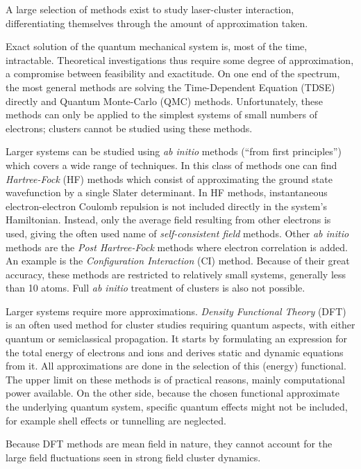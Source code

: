 A large selection of methods exist to study laser-cluster interaction,
differentiating themselves through the amount of approximation taken.

Exact solution of the quantum mechanical system is, most of the time,
intractable. Theoretical investigations thus require some degree of
approximation, a compromise between feasibility and exactitude. On one end of
the spectrum, the most general methods are solving the
Time-Dependent \schrodinger Equation (TDSE) directly and Quantum Monte-Carlo
(QMC) methods\cite{Nightingale1998}. Unfortunately, these methods can only be applied to the simplest
systems of small numbers of electrons; clusters cannot be studied using these
methods.

Larger systems can be studied using \textit{ab initio} methods (``from
first principles'') which covers a wide range of techniques. In this class of
methods one can find \textit{Hartree-Fock} (HF) methods which consist of
approximating the ground state wavefunction by a single Slater
determinant\cite{Laaksonen1986,Schafer2009}.
In HF methods, instantaneous electron-electron Coulomb repulsion is not
included directly in the system's Hamiltonian. Instead, only the average field
resulting from other electrons is used, giving the often used name of
\textit{self-consistent field} methods. Other \textit{ab
initio} methods are the \textit{Post Hartree-Fock} methods where electron
correlation is added\cite{Cramer2004}. An example is the \textit{Configuration Interaction} (CI)
method. Because of their great accuracy, these methods are restricted to
relatively small systems, generally less than 10 atoms. Full \textit{ab initio}
treatment of clusters is also not possible.

Larger systems require
more approximations. \textit{Density Functional Theory} (DFT)
is an often used method for cluster studies requiring quantum aspects, with
either quantum or semiclassical propagation\cite{Schafer2009,Fennel2010}.
It starts by formulating an
expression for the total energy of electrons and ions and derives static and
dynamic equations from it. All approximations are done in the selection of this
(energy) functional. The upper limit on these methods is of practical reasons,
mainly computational power available. On the other side, because the chosen
functional approximate the underlying quantum system, specific quantum effects
might not be included, for example shell effects or tunnelling are neglected.

Because DFT methods are mean field in nature, they cannot account for the large
field fluctuations seen in strong field cluster dynamics.

